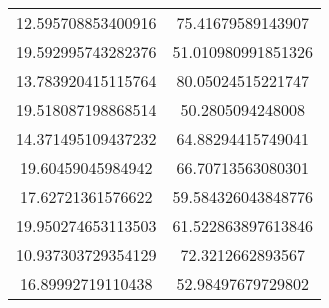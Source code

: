 \begin{table}
\begin{tabular}{cc}
12.595708853400916 & 75.41679589143907 \\
19.592995743282376 & 51.010980991851326 \\
13.783920415115764 & 80.05024515221747 \\
19.518087198868514 & 50.2805094248008 \\
14.371495109437232 & 64.88294415749041 \\
19.60459045984942 & 66.70713563080301 \\
17.62721361576622 & 59.584326043848776 \\
19.950274653113503 & 61.522863897613846 \\
10.937303729354129 & 72.3212662893567 \\
16.89992719110438 & 52.98497679729802 \\
\end{tabular}
\end{table}
